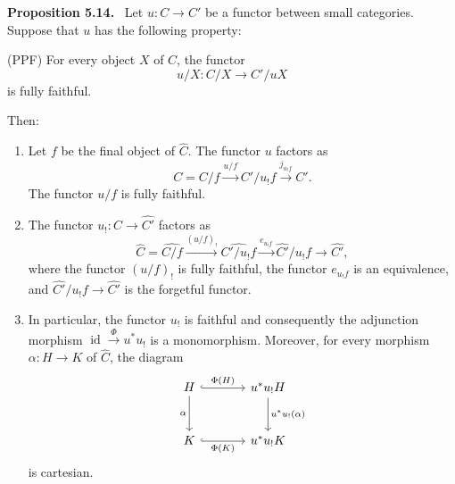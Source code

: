 \documentclass[11pt]{article}
\newcommand{\id}{\operatorname{id}}
\newenvironment{statement}[1]{\par\medskip\noindent\textbf{#1.}\ }{\par\medskip}
\begin{document}
\begin{statement}{Proposition 5.14}
Let $u:C\to C'$ be a functor between small categories. Suppose that $u$ has the following property:

\smallskip
\noindent\textup{(PPF)} For every object $X$ of $C$, the functor
\[
u/X:C/X\longrightarrow C'/uX
\]
is fully faithful.

Then:
\begin{enumerate}[label=\arabic*)]
\item Let $f$ be the final object of $\widehat C$. The functor $u$ factors as
\[
C=C/f\xrightarrow{u/f}C'/u_!f\xrightarrow{j_{u_!f}}C'.
\]
The functor $u/f$ is fully faithful.
\item The functor $u_!:\widehat C\to\widehat{C'}$ factors as
\[
\widehat C=\widehat{C/f}\xrightarrow{(u/f)_!}\widehat{C'/u_!f}\xrightarrow{e_{u_!f}}\widehat{C'}/u_!f\longrightarrow\widehat{C'},
\]
where the functor $(u/f)_!$ is fully faithful, the functor $e_{u_!f}$ is an equivalence, and $\widehat{C'}/u_!f\to\widehat{C'}$ is the forgetful functor.
\item In particular, the functor $u_!$ is faithful and consequently the adjunction morphism $\id\xrightarrow{\Phi}u^*u_!$ is a monomorphism. Moreover, for every morphism $\alpha:H\to K$ of $\widehat C$, the diagram
\[
\begin{tikzcd}[column sep=large,row sep=large]
H\arrow[r,hook,"\Phi(H)"]\arrow[d,"\alpha"']&u^*u_!H\arrow[d,"u^*u_!(\alpha)"]\\
K\arrow[r,hook,"\Phi(K)"']&u^*u_!K
\end{tikzcd}
\]
is cartesian.
\end{enumerate}
\end{statement}
\end{document}
